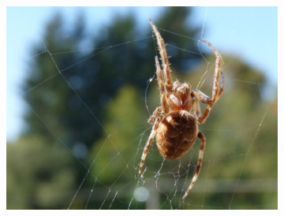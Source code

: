 \begin{figure}[H]
\begin{subfigure}{.32\textwidth}
      \includegraphics[scale=1.0]{obrazky/cropStentifordpavouk.jpg}
    \end{subfigure}
    \vspace{2pt}
    

\end{figure}
